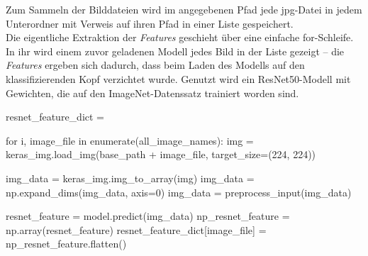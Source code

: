 \documentclass[a4paper,12pt,ngerman]{article}
\begin{document}
Zum Sammeln der Bilddateien wird im angegebenen Pfad jede jpg-Datei in jedem Unterordner mit Verweis auf ihren Pfad in einer Liste gespeichert. \\

Die eigentliche Extraktion der \textit{Features} geschieht über eine einfache for-Schleife. In ihr wird einem zuvor geladenen Modell jedes Bild in der Liste gezeigt -- die \textit{Features} ergeben sich dadurch, dass beim Laden des Modells auf den klassifizierenden Kopf verzichtet wurde. Genutzt wird ein ResNet50-Modell mit Gewichten, die auf den ImageNet-Datenssatz trainiert worden sind. \\

\begin{python}
	resnet_feature_dict = {}

	for i, image_file in enumerate(all_image_names):
		img = keras_img.load_img(base_path + image_file, target_size=(224, 224))

		img_data = keras_img.img_to_array(img)
		img_data = np.expand_dims(img_data, axis=0)
		img_data = preprocess_input(img_data)

		resnet_feature = model.predict(img_data)
		np_resnet_feature = np.array(resnet_feature)
		resnet_feature_dict[image_file] = np_resnet_feature.flatten()
\end{python}
\end{document}
